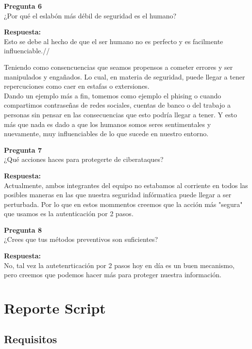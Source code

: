\documentclass{article}
\newenvironment{problem}[2][Pregunta]
    { \begin{mdframed}[backgroundcolor=gray!20] \textbf{#1 #2} \\}
    {  \end{mdframed}}
\newenvironment{solution}
    {\textbf{Respuesta:\\}}
    {}
\begin{document}
\begin{problem}
    {6} ¿Por qué el eslabón más débil de seguridad es el humano?
\end{problem}

\begin{solution}
    Esto se debe al hecho de que el ser humano no es perfecto y es facilmente influenciable.//

    Teniendo como consencuencias que seamos propensos a cometer errores y ser manipulados y engañados. Lo cual, en materia de seguridad, puede llegar a tener repercuciones como caer en estafas o extersiones.\\
    Dando un ejemplo más a fin, tomemos como ejemplo el phising o cuando compartimos contraseñas de redes sociales, cuentas de banco o del trabajo a personas sin pensar en las consecuencias que esto podría llegar a tener. Y esto más que nada es dado a que los humanos somos seres sentimentales y nuevamente, muy influenciables de lo que sucede en nuestro entorno.
    
\end{solution}

\begin{problem}
    {7} ¿Qué acciones haces para protegerte de ciberataques? 
\end{problem}

\begin{solution}
    Actualmente, ambos integrantes del equipo no estabamos al corriente en todos las posibles maneras en las que nuestra seguridad infórmatica puede llegar a ser perturbada. Por lo que en estos mommentos creemos que la acción más "segura" que usamos es la autenticación por 2 pasos.
\end{solution}

\begin{problem}
    {8}  ¿Crees que tus métodos preventivos son suficientes?
\end{problem}

\begin{solution}
    No, tal vez la autetenrticación por 2 pasos hoy en día es un buen mecanismo, pero creemos que podemos hacer más para proteger nuestra información.
\end{solution}


\section{Reporte Script}

\subsection{Requisitos}
\end{document}
